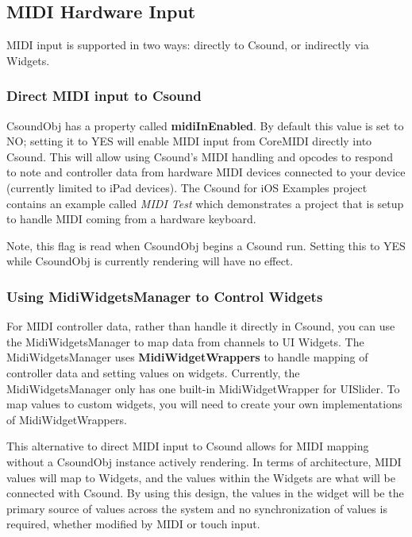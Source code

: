 \documentclass[11pt]{article}
\begin{document}
\subsection{MIDI Hardware Input}

MIDI input is supported in two ways: directly to Csound, or indirectly via Widgets.

\subsubsection{Direct MIDI input to Csound}

CsoundObj has a property called \textbf{midiInEnabled}.  By default this value is set to NO; setting it to YES will enable MIDI input from CoreMIDI directly into Csound. This will allow using Csound's MIDI handling and opcodes to respond to note and controller data from hardware MIDI devices connected to your device (currently limited to iPad devices).  The Csound for iOS Examples project contains an example called \emph{MIDI Test} which demonstrates a project that is setup to handle MIDI coming from a hardware keyboard.

Note, this flag is read when CsoundObj begins a Csound run.  Setting this to YES while CsoundObj is currently rendering will have no effect.

\subsubsection{Using MidiWidgetsManager to Control Widgets}

For MIDI controller data, rather than handle it directly in Csound, you can use the MidiWidgetsManager to map data from channels to UI Widgets.  The MidiWidgetsManager uses \textbf{MidiWidgetWrappers} to handle mapping of controller data and setting values on widgets.  Currently, the MidiWidgetsManager only has one built-in MidiWidgetWrapper for UISlider. To map values to custom widgets, you will need to create your own implementations of MidiWidgetWrappers.

This alternative to direct MIDI input to Csound allows for MIDI mapping without a CsoundObj instance actively rendering. In terms of architecture, MIDI values will map to Widgets, and the values within the Widgets are what will be connected with Csound.  By using this design, the values in the widget will be the primary source of values across the system and no synchronization of values is required, whether modified by MIDI or touch input.
\end{document}
